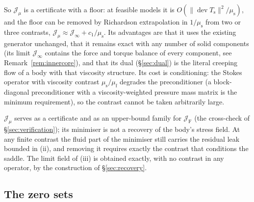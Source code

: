 \documentclass[11pt]{article}
\newcommand{\Jf}{\mathscr{J}}  %
\newcommand{\dev}{\operatorname{dev}}
\newcommand{\norm}[1]{\lVert #1 \rVert}
\newcommand{\JF}{\Jf _{\mathrm{F}}}
\newcommand{\Jmu}{\Jf _{\mu}}
\begin{document}
So $\Jmu$ is a certificate with a floor: at feasible models it is
$O(\norm{\dev T_{\mathrm{s}}}^{2}/\mu_{\mathrm{s}})$, and the floor can
be removed by Richardson extrapolation in $1/\mu_{\mathrm{s}}$ from two or
three contrasts, $\Jmu \approx \Jf _\infty + c_1/\mu_{\mathrm{s}}$. Its
advantages are that it uses the existing generator unchanged, that it
remains exact with any number of solid components (its limit $\Jf _\infty$
contains the force and torque balance of every component, see
Remark~\ref{rem:innercore}), and that its dual (\S\ref{sec:dual}) is the
literal creeping flow of a body with that viscosity structure. Its cost
is conditioning: the Stokes operator with viscosity contrast
$\mu_{\mathrm{s}}/\mu_{\mathrm{f}}$ degrades the preconditioner (a
block-diagonal preconditioner with a viscosity-weighted pressure mass
matrix is the minimum requirement), so the contrast cannot be taken
arbitrarily large.

$\Jmu$ serves as a certificate and as an upper-bound family for $\JF$
(the cross-check of \S\ref{sec:verification}); its minimiser is not a
recovery of the body's stress field. At any finite contrast the fluid
part of the minimiser still carries the residual leak bounded in (ii),
and removing it requires exactly the contrast that conditions the
saddle. The limit field of (iii) is obtained exactly, with no contrast
in any operator, by the construction of \S\ref{sec:recovery}.

\subsection{The zero sets}
\label{sec:zeroset}
\end{document}
